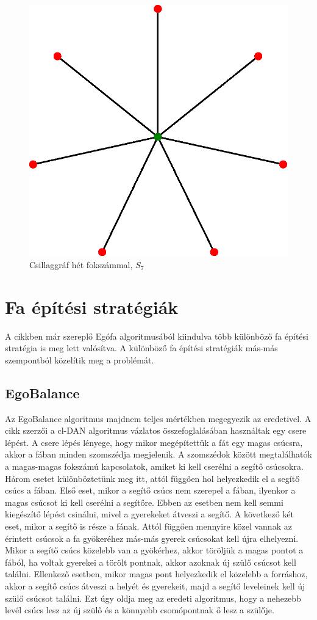\documentclass[12pt]{report}
\begin{document}
\begin{figure}[H]
	\begin{center}
		\includegraphics[width=0.4\linewidth]{pictures/Star_network_7.eps}
		\caption{Csillaggráf hét fokszámmal, \(S_7\) \cite{wikipedia_csillag}}
		\label{star}
	\end{center}
\end{figure}

\section{Fa építési stratégiák}

A cikkben \cite{avin_demand-aware_nodate} már szereplő Egófa algoritmusából kiindulva több különböző fa építési stratégia is meg lett valósítva.
A különböző fa építési stratégiák más-más szempontból közelítik meg a problémát.

\subsection{EgoBalance}

Az EgoBalance algoritmus majdnem teljes mértékben megegyezik az eredetivel.
A cikk szerzői a cl-DAN algoritmus vázlatos összefoglalásában használtak egy csere lépést.
A csere lépés lényege, hogy mikor megépítettük a fát egy magas csúcsra, akkor a fában minden szomszédja megjelenik.
A szomszédok között megtalálhatók a magas-magas fokszámú kapcsolatok, amiket ki kell cserélni a segítő csúcsokra.
Három esetet különböztetünk meg itt, attól függően hol helyezkedik el a segítő csúcs a fában.
Első eset, mikor a segítő csúcs nem szerepel a fában, ilyenkor a magas csúcsot ki kell cserélni a segítőre. Ebben az esetben nem kell semmi kiegészítő lépést csinálni, mivel a gyerekeket átveszi a segítő.
A következő két eset, mikor a segítő is része a fának. 
Attól függően mennyire közel vannak az érintett csúcsok a fa gyökeréhez más-más gyerek csúcsokat kell újra elhelyezni.
Mikor a segítő csúcs közelebb van a gyökérhez, akkor töröljük a magas pontot a fából, ha voltak gyerekei a törölt pontnak, akkor azoknak új szülő csúcsot kell találni.
Ellenkező esetben, mikor magas pont helyezkedik el közelebb a forráshoz, akkor a segítő csúcs átveszi a helyét és gyerekeit, majd a segítő leveleinek kell új szülő csúcsot találni. 
Ezt úgy oldja meg az eredeti algoritmus, hogy a nehezebb levél csúcs lesz az új szülő és a könnyebb csomópontnak ő lesz a szülője.
\end{document}
